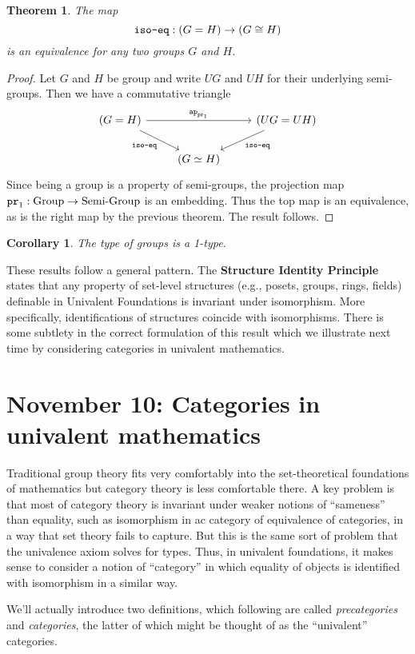 \documentclass{amsart}
\theoremstyle{theorem}
\newtheorem*{thm}{Theorem}
\newtheorem*{cor}{Corollary}
\theoremstyle{definition}
\theoremstyle{remark}
\newcommand{\0}{\mathbbe{0}}
\newcommand{\1}{\mathbbe{1}}
\newcommand{\2}{\mathbbe{2}}
\newcommand{\3}{\mathbbe{3}}
\newcommand{\4}{\mathbbe{4}}
\newcommand{\term}[1]{{\textup{\texttt{#1}}}}
\newcommand{\type}[1]{{\textup{#1}}}
\newcommand{\pr}{\term{pr}}
\newcommand{\ap}{\term{ap}}
\begin{document}
\begin{thm} The map 
\[
\term{iso-eq} : (G=H) \to (G \cong H)\]
is an equivalence for any two groups $G$ and $H$.
\end{thm}
\begin{proof}
Let $G$ and $H$ be group and write $UG$ and $UH$ for their underlying semi-groups. Then we have a commutative triangle
\[
\begin{tikzcd} (G = H) \arrow[rr, "{\ap_{\pr_1}}"] \arrow[dr, "\term{iso-eq}"'] & & (UG = UH) \arrow[dl, "\term{iso-eq}"] \\ & (G \simeq H)
\end{tikzcd}
\]
Since being a group is a property of semi-groups, the projection map $\pr_1 : \type{Group} \to \type{Semi-Group}$ is an embedding. Thus the top map is an equivalence, as is the right map by the previous theorem. The result follows.
\end{proof}

\begin{cor} The type of groups is a 1-type.
\end{cor}

These results follow a general pattern. The \textbf{Structure Identity Principle} states that any property of set-level structures (e.g., posets, groups, rings, fields) definable in Univalent Foundations is invariant under isomorphism. More specifically, identifications of structures coincide with isomorphisms. There is some subtlety in the correct formulation of this result which we illustrate next time by considering categories in univalent mathematics.

\section*{November 10: Categories in univalent mathematics}

Traditional group theory fits very comfortably into the set-theoretical foundations of mathematics but category theory is less comfortable there. A key problem is that most of category theory is invariant under weaker notions of ``sameness'' than equality, such as isomorphism in ac category of equivalence of categories, in a way that set theory fails to capture. But this is the same sort of problem that the univalence axiom solves for types. Thus, in univalent foundations, it makes sense to consider a notion of ``category'' in which equality of objects is identified with isomorphism in a similar way. 

We'll actually introduce two definitions, which following \cite{book-hott} are called \emph{precategories} and \emph{categories}, the latter of which might be thought of as the ``univalent'' categories. 
\end{document}
